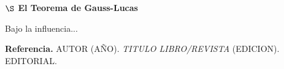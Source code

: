 


\begin{center}
    {\large \textbf{ $\S$ El Teorema de Gauss-Lucas}}
\end{center}

{\fontsize{7}{5}
Bajo la influencia... 
}

{\small
\textbf{Referencia.}
AUTOR (AÑO). \textit{TITULO LIBRO/REVISTA} (EDICION). EDITORIAL.
} 

